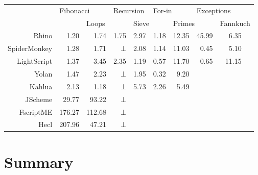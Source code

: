 \documentclass[11pt]{report}
\begin{document}
\begin{center} \begin{tabular}{|r|r|r|r|r|r|r|r|rr|} \hline 
& \multicolumn{2}{|l|}{Fibonacci} & \multicolumn{2}{|l|}{Recursion} & \multicolumn{2}{|l|}{For-in} & \multicolumn{2}{|l}{Exceptions} & \\
& & \multicolumn{2}{|l|}{Loops} & \multicolumn{2}{|l|}{Sieve} & \multicolumn{2}{|l|}{Primes} & \multicolumn{2}{|l|}{Fannkuch} \\
\hline Rhino       & 1.20 & 1.74 & 1.75   & 2.97 & 1.18 & 12.35 & 45.99 & 6.35 & \\ 
\hline SpiderMonkey& 1.28 & 1.71 & $\bot$ & 2.08 & 1.14 & 11.03 & 0.45  & 5.10 & \\ 
\hline LightScript & 1.37 & 3.45 & 2.35   & 1.19 & 0.57 & 11.70 & 0.65  & 11.15 & \\
\hline Yolan       & 1.47 & 2.23 & $\bot$ & 1.95 & 0.32 &  9.20 &  &  & \\
\hline Kahlua      & 2.13 & 1.18 & $\bot$ &  5.73 & 2.26 & 5.49 &  &  & \\ 
\hline JScheme    & 29.77 & 93.22 & $\bot$ & & & & & & \\ 
\hline FscriptME & 176.27 & 112.68& $\bot$ & & & & & & \\ 
\hline Hecl      & 207.96 & 47.21 & $\bot$ & & & & & & \\ 
\hline \end{tabular}
\end{center} 

\section{Summary}
\end{document}
